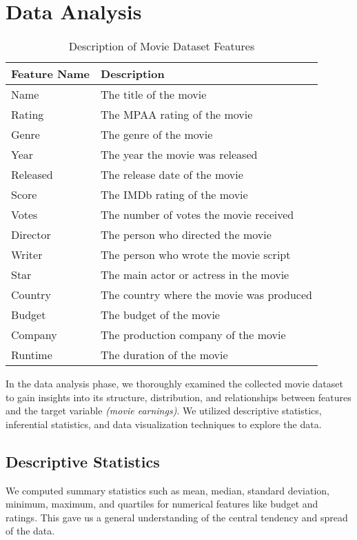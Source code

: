 \documentclass[conference]{IEEEtran}
\begin{document}
\section{Data Analysis}
   \begin{table}[h]
    \centering
    \captionsetup{justification=centering}
    \caption{Description of Movie Dataset Features}
    \label{tab:movie_dataset_features}
    \renewcommand{\arraystretch}{1.5}
    \begin{tabular}{>{\centering\arraybackslash}m{1cm} >{\centering\arraybackslash}m{6cm}}
        \toprule
        \textbf{Feature Name} & \textbf{Description} \\
        \midrule
        Name & The title of the movie \\
        Rating & The MPAA rating of the movie \\
        Genre & The genre of the movie \\
        Year & The year the movie was released \\
        Released & The release date of the movie \\
        Score & The IMDb rating of the movie \\
        Votes & The number of votes the movie received \\
        Director & The person who directed the movie \\
        Writer & The person who wrote the movie script \\
        Star & The main actor or actress in the movie \\
        Country & The country where the movie was produced \\
        Budget & The budget of the movie \\
        Company & The production company of the movie \\
        Runtime & The duration of the movie \\
        \bottomrule
    \end{tabular}
\end{table}

    In the data analysis phase, we thoroughly examined the collected movie dataset to gain insights into its structure, distribution, and relationships between features and the target variable \textit{(movie earnings)}. We utilized descriptive statistics, inferential statistics, and data visualization techniques to explore the data.
    
    \subsection{Descriptive Statistics}
        We computed summary statistics such as mean, median, standard deviation, minimum, maximum, and quartiles for numerical features like budget and ratings. This gave us a general understanding of the central tendency and spread of the data.
    
\end{document}
